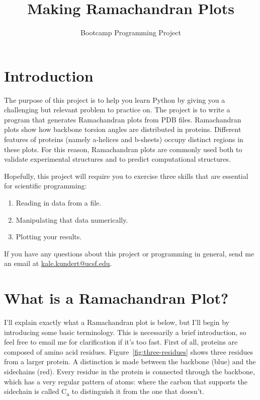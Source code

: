 \documentclass{article}
\newcommand{\calpha}{C\textsubscript{\textgreek{a}}}
\newcommand{\ahelices}{\textgreek{a}-helices}
\newcommand{\bsheets}{\textgreek{b}-sheets}
\begin{document}
\title{Making Ramachandran Plots}
\author{\the\year{} Bootcamp Programming Project}
\date{}
\maketitle{}

\section{Introduction}

The purpose of this project is to help you learn Python by giving you a 
challenging but relevant problem to practice on.  The project is to write a 
program that generates Ramachandran plots from PDB files.  Ramachandran plots 
show how backbone torsion angles are distributed in proteins.  Different 
features of proteins (namely \ahelices{} and \bsheets{}) occupy distinct 
regions in these plots.  For this reason, Ramachandran plots are commonly used 
both to validate experimental structures and to predict computational 
structures.

Hopefully, this project will require you to exercise three skills that are 
essential for scientific programming:

\begin{enumerate}
 \item Reading in data from a file.
 \item Manipulating that data numerically.
 \item Plotting your results.
\end{enumerate}

If you have any questions about this project or programming in general, send me 
an email at \href{mailto:kale.kundert@ucsf.edu}{kale.kundert@ucsf.edu}.

\section{What is a Ramachandran Plot?}

I'll explain exactly what a Ramachandran plot is below, but I'll begin by 
introducing some basic terminology.  This is necessarily a brief introduction, 
so feel free to email me for clarification if it's too fast.  First of all, 
proteins are composed of amino acid residues.  Figure~\ref{fig:three-residues} 
shows three residues from a larger protein.  A distinction is made between the 
backbone (blue) and the sidechains (red).  Every residue in the protein is 
connected through the backbone, which has a very regular pattern of atoms: 
 where the 
carbon that supports the sidechain is called \calpha{} to distinguish it from 
the one that doesn't.
\end{document}
